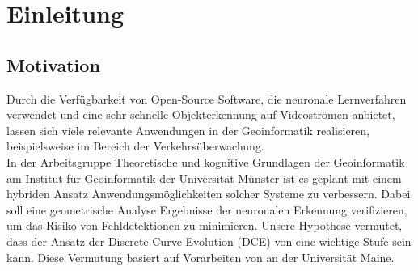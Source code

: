 \chapter{Einleitung}
\label{ch:intro}

\section{Motivation}{ 
	
Durch die Verfügbarkeit von Open-Source Software, die neuronale Lernverfahren verwendet und eine sehr schnelle Objekterkennung auf Videoströmen anbietet, lassen sich viele relevante Anwendungen in der Geoinformatik realisieren, beispielsweise im Bereich der Verkehrsüberwachung. \\
In der Arbeitsgruppe \glqq Theoretische und kognitive Grundlagen der Geoinformatik \grqq{} am Institut für Geoinformatik der Universität Münster ist es geplant mit einem hybriden Ansatz Anwendungsmöglichkeiten solcher Systeme zu verbessern. Dabei soll eine geometrische Analyse Ergebnisse der neuronalen Erkennung verifizieren, um das Risiko von Fehldetektionen zu minimieren. Unsere Hypothese vermutet, dass der Ansatz der Discrete Curve Evolution (DCE) von \citet{Latecki1999a}  eine wichtige Stufe sein kann. Diese Vermutung basiert auf Vorarbeiten von \citet*{Dorr2015} an der Universität Maine.
}



